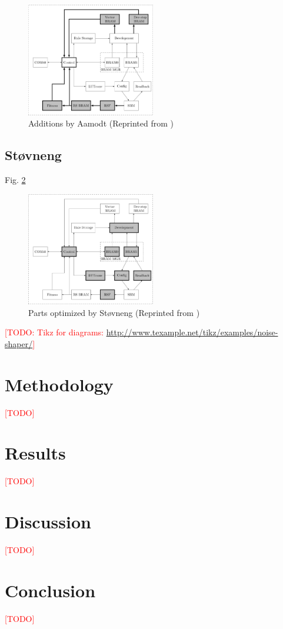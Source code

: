 \documentclass[a4paper]{IEEEtran}
\newcommand\TODO{\textcolor{red}{[TODO]}}
\newcommand\todo[1]{\textcolor{red}{[TODO: #1]}}
\begin{document}
\begin{figure}[h!]
    \centering
    \includegraphics[width=0.5\textwidth]{figures/ca-aamodt}
    \caption{Additions by Aamodt (Reprinted from \cite{stovneng2014sblock})}
    \label{fig:ca-aamodt}
\end{figure}

\subsection{Støvneng \cite{stovneng2014sblock}}

Fig. \ref{fig:ca-stovneng}

\begin{figure}[h!]
    \centering
    \includegraphics[width=0.5\textwidth]{figures/ca-stovneng}
    \caption{Parts optimized by Støvneng (Reprinted from \cite{stovneng2014sblock})}
    \label{fig:ca-stovneng}
\end{figure}

\todo{Tikz for diagrams: \url{http://www.texample.net/tikz/examples/noise-shaper/}}

\section{Methodology}

\TODO

\section{Results}

\TODO

\section{Discussion}

\TODO

\section{Conclusion}

\TODO



\end{document}

